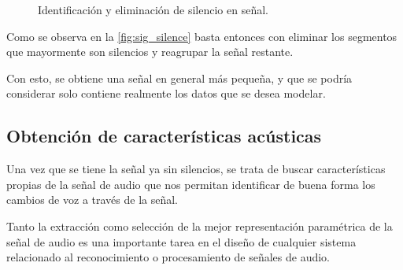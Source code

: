 \begin{figure}[bth]
        \myfloatalign
         \quad

         \quad

        \caption{Identificación y eliminación de silencio en señal.}
        \label{fig:sig_silence}
\end{figure}

Como se observa en la \autoref{fig:sig_silence} basta entonces con 
eliminar los segmentos que mayormente son silencios y reagrupar la 
señal restante.

Con esto, se obtiene una señal en general más pequeña, y que se podría 
considerar solo contiene realmente los datos que se desea modelar.

\subsection{Obtención de características acústicas}

Una vez que se tiene la señal ya sin silencios, se trata de buscar 
características propias de la señal de audio que nos permitan identificar 
de buena forma los cambios de voz a través de la señal.

Tanto la extracción como selección de la mejor representación paramétrica
de la señal de audio es una importante tarea en el diseño de cualquier 
sistema relacionado al reconocimiento o procesamiento de señales de audio. 

